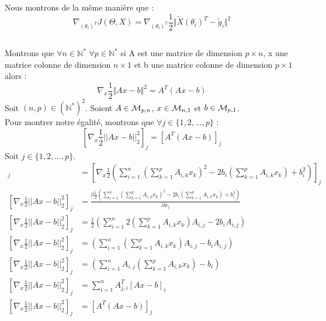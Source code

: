 \documentclass[a4paper,10pt]{article}
\begin{document}
Nous montrons de la même manière que : \[\nabla_{(\theta_{i})^T} J(\Theta, X) = \nabla_{(\theta_{i})^T}\frac{1}{2}\Vert\tilde{X}(\theta_{i})^{T}-\tilde{y}_{i}\Vert^{2}\]
\subsection{}  
\label{P2}
Montrons que $\forall n \in \mathbb{N}^{*}$ $\forall p \in \mathbb{N}^{*}$ si A est une matrice de dimension $p \times n$, x une matrice colonne de dimension $n \times 1$ et b une matrice colonne de dimension $p \times 1$ alors : \[\nabla_{x}\frac{1}{2}\Vert Ax-b \Vert^2 = A^{T}(Ax-b)\]
Soit $(n,p) \in (\mathbb{N}^*)^2$. Soient $A \in {\cal M}_{p, n}$, $x \in {\cal M}_{n, 1}$ et $b \in {\cal M}_{p, 1}$.\\
Pour montrer notre égalité, montrons que $\forall j \in \{1, 2, ..., p\}$ : \[[\nabla_{x} \frac{1}{2}||Ax - b||^{2}_{2}]_{j} = [A^{T}(Ax - b)]_{j}\]
Soit $j \in \{1, 2, ..., p\}$.
\begin{align*}  
[\nabla_{x} \frac{1}{2}||Ax - b||^{2}_{2}]_{j} &= [\nabla_{x} \frac{1}{2}(\sum^{n}_{i = 1} (\sum^{p}_{k = 1} A_{i, k}x_{k})^{2} - 2b_{i}(\sum^{p}_{k = 1} A_{i, k}x_{k}) + b_{i}^{2})]_{j}\\  
[\nabla_{x} \frac{1}{2}||Ax - b||^{2}_{2}]_{j} &= \frac{\partial\frac{1}{2}(\sum^{n}_{i = 1} (\sum^{p}_{k = 1} A_{i, k}x_{k})^{2} - 2b_{i}(\sum^{p}_{k = 1} A_{i, k}x_{k}) + b_{i}^{2})}{\partial x_{j}}\\  
[\nabla_{x} \frac{1}{2}||Ax - b||^{2}_{2}]_{j} &= \frac{1}{2}(\sum^{n}_{i = 1} 2(\sum^{p}_{k = 1} A_{i, k}x_{k})A_{i, j} - 2b_{i} A_{i, j})\\  
[\nabla_{x} \frac{1}{2}||Ax - b||^{2}_{2}]_{j} &= (\sum^{n}_{i = 1} (\sum^{p}_{k = 1} A_{i, k}x_{k})A_{i, j} - b_{i} A_{i, j})\\  
[\nabla_{x} \frac{1}{2}||Ax - b||^{2}_{2}]_{j} &= (\sum^{n}_{i = 1} A_{i, j}(\sum^{p}_{k = 1} A_{i, k}x_{k}) - b_{i} )\\  
[\nabla_{x} \frac{1}{2}||Ax - b||^{2}_{2}]_{j} &= \sum^{n}_{i = 1} A^{T}_{j, i}[Ax - b]_{i}\\  
[\nabla_{x} \frac{1}{2}||Ax - b||^{2}_{2}]_{j} &= [A^{T}(Ax - b)]_{j}  
\end{align*}
\end{document}
